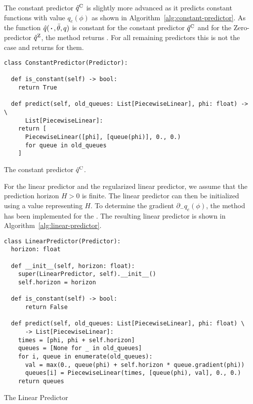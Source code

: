 The constant predictor $\hat q^{\text{C}}$ is slightly more advanced as it predicts constant functions with value $q_e(\phi)$ as shown in Algorithm~\ref{alg:constant-predictor}.
As the function $\hat q(\,\boldsymbol{\cdot}\,, \bar\theta, q)$ is constant for the constant predictor $\hat q^{\text{C}}$ and for the Zero-predictor $\hat q^{\text{Z}}$, the method  returns .
For all remaining predictors this is not the case and  returns  for them.

\begin{algorithm}[H]
  \begin{verbatim}
class ConstantPredictor(Predictor):

  def is_constant(self) -> bool:
    return True

  def predict(self, old_queues: List[PiecewiseLinear], phi: float) -> \
      List[PiecewiseLinear]:
    return [
      PiecewiseLinear([phi], [queue(phi)], 0., 0.)
      for queue in old_queues
    ]
\end{verbatim}
\caption{The constant predictor $\hat q^{\text{C}}$.}
\label{alg:constant-predictor}
\end{algorithm}

For the linear predictor and the regularized linear predictor, we assume that the prediction horizon $H>0$ is finite.
The linear predictor can then be initialized using a value \code{horizon} representing $H$.
To determine the gradient $\partial_-q_e(\phi)$, the method \code{gradient} has been implemented for the .
The resulting linear predictor is shown in Algorithm~\ref{alg:linear-predictor}.

\begin{algorithm}[H]
  \begin{verbatim}
class LinearPredictor(Predictor):
  horizon: float

  def __init__(self, horizon: float):
    super(LinearPredictor, self).__init__()
    self.horizon = horizon

  def is_constant(self) -> bool:
      return False

  def predict(self, old_queues: List[PiecewiseLinear], phi: float) \
      -> List[PiecewiseLinear]:
    times = [phi, phi + self.horizon]
    queues = [None for _ in old_queues]
    for i, queue in enumerate(old_queues):
      val = max(0., queue(phi) + self.horizon * queue.gradient(phi))
      queues[i] = PiecewiseLinear(times, [queue(phi), val], 0., 0.)
    return queues
  \end{verbatim}
  \caption{The Linear Predictor}
  \label{alg:linear-predictor}
\end{algorithm}

